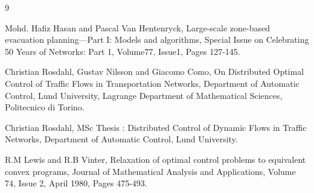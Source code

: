 \documentclass[12pt]{article}
\begin{document}
\begin{thebibliography}{9}

Mohd. Hafiz Hasan and Pascal Van Hentenryck,
Large-scale zone-based evacuation planning—Part I: Models and algorithms,
Special Issue on Celebrating 50 Years of Networks: Part 1,
Volume77, Issue1, Pages 127-145.

Christian Rosdahl, Gustav Nilsson and Giacomo Como,
On Distributed Optimal Control of Traffic Flows in Transportation Networks,
Department of Automatic Control, Lund University,
Lagrange Department of Mathematical Sciences, Politecnico di Torino.

Christian Rosdahl,
MSc Thesis : Distributed Control of Dynamic Flows in Traffic Networks,
Department of Automatic Control, Lund University.

R.M Lewis and R.B Vinter,
Relaxation of optimal control problems to equivalent convex programs,
Journal of Mathematical Analysis and Applications,
Volume 74, Issue 2, April 1980, Pages 475-493.


\end{thebibliography}

\newpage
\listoffigures
\end{document}
